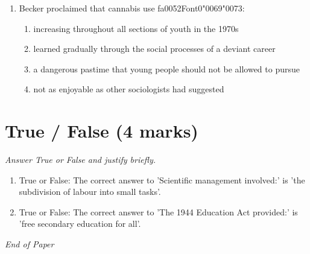 \documentclass[12pt]{article}
\begin{document}
\begin{enumerate}[label=\arabic*.]
\begin{enumerate}[label=(\alph*)]
    \item the moral teachings of the main religions were becoming relatively similar
    \item all of the above
\end{enumerate}
\item Becker proclaimed that cannabis use {\csname fa0052Font0\endcsname\char"0069}{\char"0073}:
\begin{enumerate}[label=(\alph*)]
    \item increasing throughout all sections of youth in the 1970s
    \item learned gradually through the social processes of a deviant career
    \item a dangerous pastime that young people should not be allowed to pursue
    \item not as enjoyable as other sociologists had suggested
\end{enumerate}
\end{enumerate}

\section*{True / False (4 marks)}
\textit{Answer True or False and justify briefly.}
\begin{enumerate}[label=\arabic*.]
\item True or False: The correct answer to 'Scientific management involved:' is 'the subdivision of labour into small tasks'.
\item True or False: The correct answer to 'The 1944 Education Act provided:' is 'free secondary education for all'.
\end{enumerate}

\vfill
\noindent\textit{End of Paper}
\end{document}
